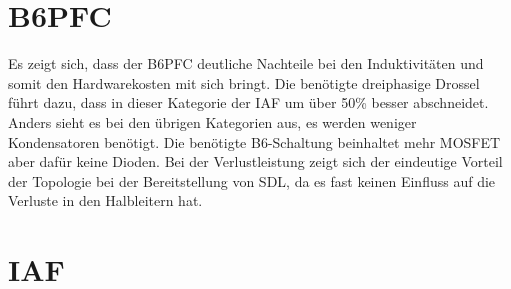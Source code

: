 \section{B6PFC}
	
	
	Es zeigt sich, dass der \gls{B6PFC} deutliche Nachteile bei den Induktivitäten und somit den Hardwarekosten mit sich bringt. Die benötigte dreiphasige Drossel führt dazu, dass in dieser Kategorie der IAF um über 50\% besser abschneidet.
	Anders sieht es bei den übrigen Kategorien aus, es werden weniger Kondensatoren benötigt. Die benötigte B6-Schaltung beinhaltet mehr \gls{MOSFET} aber dafür keine Dioden. Bei der Verlustleistung zeigt sich der eindeutige Vorteil der Topologie bei der Bereitstellung von \gls{SDL}, da es fast keinen Einfluss auf die Verluste in den Halbleitern hat. 
	

\section{IAF}
